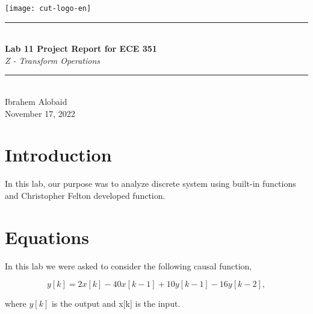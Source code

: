 \documentclass[12pt,a4paper]{article}
\newcommand{\HRule}{\rule{\linewidth}{0.5mm}}
\begin{document}
\begin{titlepage}
\begin{center}
\texttt{[image: cut-logo-en]}~\\[2cm]
\HRule \\[0.4cm]
{ \LARGE 
  \textbf{Lab 11 Project Report for ECE 351}\\[0.4cm]
  \emph{Z - Transform Operations}\\[0.4cm]
}
\HRule \\[1.5cm]
{ \large
  Ibrahem Alobaid \\[0.1cm]
  November 17, 2022\\[0.1cm]
}
\vfill

\end{center}
\end{titlepage}
\newpage
\tableofcontents
{}
\newpage
\setcounter{page}{1}
\section{Introduction}\label{sec:intro}
    In this lab, our purpose was to analyze discrete system using built-in functions and Christopher Felton developed function.

\section{Equations}\label{sec:lit-rev}

    In this lab we were asked to consider the following causal function,

    $$y[k] = 2x[k] - 40x[k-1] + 10y[k-1] - 16y[k-2],$$
    
    where $y[k]$ is the output and x[k] is the input.
\end{document}
